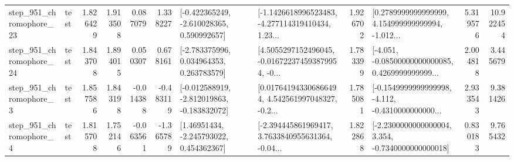 \begin{tabular}{llrrrrllrlrr}
  step\_951\_chromophore\_23 &      test &      1.826429 &    1.913508 &      0.087079 &  1.338227 &   [-0.422365249, -2.610028365, 0.590992657] &  [-1.1426618996523483, -4.277114319410434, 1.23... &       1.926702 &  [0.2789999999999999, 4.154999999999994, -1.012... &            5.319576 &         10.922454 \\
  step\_951\_chromophore\_24 &      test &      1.843708 &    1.894015 &      0.050307 &  0.678161 &    [-2.783375996, 0.034964353, 0.263783579] &  [4.5055297152496045, -0.016722374593879954, -0... &       1.783399 &  [-4.051, -0.08500000000000085, 0.4269999999999... &            2.004818 &          3.445679 \\
   step\_951\_chromophore\_3 &      test &      1.857586 &    1.843198 &     -0.014388 & -0.483119 &  [-0.012588919, -2.812019863, -0.183832072] &  [0.017641943306866494, 4.542561997048327, -0.2... &       1.785081 &  [-0.1549999999999998, -4.112, -0.4310000000000... &            2.933543 &          9.381426 \\
   step\_951\_chromophore\_4 &      test &      1.815708 &    1.752146 &     -0.063561 & -1.365789 &     [1.46951434, -2.245793022, 0.454362367] &  [-2.394445861969417, 3.7633840955631364, -0.04... &       1.822868 &  [-2.2300000000000004, 3.354, -0.7340000000000018] &            0.830183 &          9.765432 \\
\bottomrule
\end{tabular}

